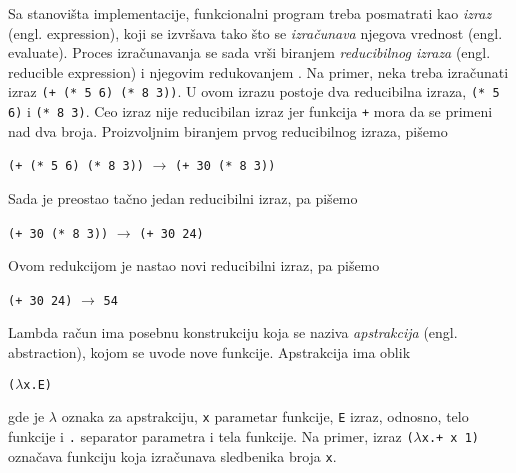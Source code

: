 Sa stanovišta implementacije, funkcionalni program treba posmatrati kao \textit{izraz} (engl. expression), koji se izvršava tako što se \textit{izračunava} njegova vrednost (engl. evaluate). Proces izračunavanja se sada vrši biranjem \textit{reducibilnog izraza} (engl. reducible expression) i njegovim redukovanjem \cite{the-implementation-of-functional-programming-languages}. Na primer, neka treba izračunati izraz \verb|(+ (* 5 6) (* 8 3))|. U ovom izrazu postoje dva reducibilna izraza, \verb|(* 5 6)| i \verb|(* 8 3)|. Ceo izraz nije reducibilan izraz jer funkcija \verb|+| mora da se primeni nad dva broja. Proizvoljnim biranjem prvog reducibilnog izraza, pišemo
\begin{center}
	\verb|(+ (* 5 6) (* 8 3))| $\rightarrow$ \verb|(+ 30 (* 8 3))|
\end{center}
Sada je preostao tačno jedan reducibilni izraz, pa pišemo
\begin{center}
	\verb|(+ 30 (* 8 3))| $\rightarrow$ \verb|(+ 30 24)|
\end{center}
Ovom redukcijom je nastao novi reducibilni izraz, pa pišemo
\begin{center}
	\verb|(+ 30 24)| $\rightarrow$ \verb|54|
\end{center}

Lambda račun ima posebnu konstrukciju koja se naziva \textit{apstrakcija} (engl. abstraction), kojom se uvode nove funkcije. Apstrakcija ima oblik
\begin{center}
	\verb|(|$\lambda$\verb|x.E)|
\end{center} 
gde je $\lambda$ oznaka za apstrakciju, \verb|x| parametar funkcije, \verb|E| izraz, odnosno, telo funkcije i \verb|.| separator parametra i tela funkcije. Na primer, izraz \verb|(|$\lambda$\verb|x.+ x 1)| označava funkciju koja izračunava sledbenika broja \verb|x|.

